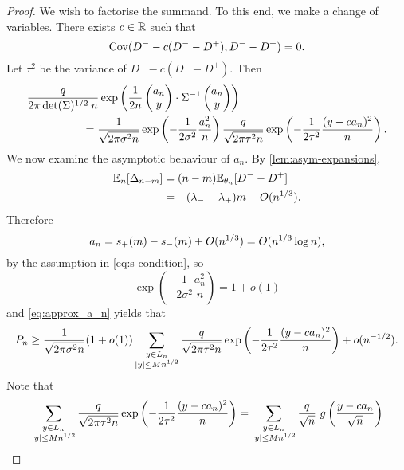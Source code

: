 \begin{proof}
    We wish to factorise the summand. To this end, we make a change of variables. There exists $c \in {\mathbb R}$ such that
    \begin{equation*}
        \operatorname{Cov}(D^- - c(D^- - D^+), D^- - D^+) = 0.
    \end{equation*}
    Let $\tau^2$ be the variance of $D^- - c(D^- - D^+)$. Then
    \begin{align}
         &\frac{q}{2\pi \det(\Sigma)^{1/2} \: n} \exp\left( 
            \frac{1}{2n} \begin{pmatrix} a_n \\ y \end{pmatrix} \cdot \Sigma^{-1} \begin{pmatrix} a_n \\ y \end{pmatrix}
         \right) \nonumber \\
         & \hspace{5em} =
         \frac{1}{\sqrt{2 \pi \sigma^2 n}} \exp \left( - \frac{1}{2 \sigma^2} \frac{a_n^2}{n} \right)
         \frac{q}{\sqrt{2 \pi \tau^2 n}} \exp \left( - \frac{1}{2 \tau^2} \frac{(y - ca_n)^2}{n} \right).\label{eq:approx_a_n}
    \end{align}
    We now examine the asymptotic behaviour of $a_n$. By \cref{lem:asym-expansions},
    \begin{align*}
        {\mathbb E}_n[\Delta_{n-m}]
        &= (n - m) {\mathbb E}_{\theta_n}[D^- - D^+] \\ 
        &= -(\lambda_- - \lambda_+)m + O(n^{1/3}).
    \end{align*}
    Therefore 
    \begin{equation*}
        a_n = s_+(m) - s_-(m) + O(n^{1/3}) = O(n^{1/3} \log n),
    \end{equation*}
    by the assumption in \cref{eq:s-condition}, so 
    \[\exp \left( - \frac{1}{2 \sigma^2} \frac{a_n^2}{n} \right)=1+o(1) \]
    and \cref{eq:approx_a_n} yields that 
    \begin{equation*}
        P_n \geq
        \frac{1}{\sqrt{2 \pi \sigma^2 n}}(1 + o(1))
        \sum_{\substack{y \in L_n \\ \lvert y\rvert \leq M n^{1/2}}}
        \frac{q}{\sqrt{2 \pi \tau^2 n}} \exp \left( - \frac{1}{2 \tau^2} \frac{(y - ca_n)^2}{n} \right)
        + o(n^{-1/2}).
    \end{equation*}
    Note that
    \begin{equation*}
        \sum_{\substack{y \in L_n \\ \abs{y} \leq M n^{1/2}}}
        \frac{q}{\sqrt{2 \pi \tau^2 n}} \exp \left( - \frac{1}{2 \tau^2} \frac{(y - ca_n)^2}{n} \right)
        = \sum_{\substack{y \in L_n \\ \abs{y} \leq M n^{1/2}}}
        \frac{q}{\sqrt{n}}\ g\left( \frac{y - ca_n}{\sqrt{n}} \right)

\end{equation*}
\end{proof}
